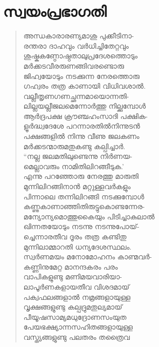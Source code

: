 
\section{സ്വയംപ്രഭാഗതി}

\begin{verse}
അന്ധകാരാരണ്യമാശു പുക്കീടിനാ-\\
രന്തരാ ദാഹവും വര്‍ധിച്ചിതേറ്റവും\\
ശുഷ്കകണ്ഠോഷ്ഠതാലുപ്രദേശത്തൊടും\\
മര്‍ക്കടവീരരുണങ്ങിവരണ്ടൊരു\\
ജിഹ്വയോടും നടക്കുന്ന നേരത്തൊരു\\
ഗഹ്വരം തത്ര കാണായി വിധിവശാല്‍.\\
വല്ലീതൃണഗണച്ഛന്നമായൊന്നതി-\\
ലില്ലയല്ലീജലമെന്നോര്‍ത്തു നില്ക്കുമ്പോള്‍\\
ആര്‍ദ്രപക്ഷ ക്രൗഞ്ചഹംസാദി പക്ഷിക-\\
ളൂര്‍ദ്ധ്വദേശേ പറന്നാരതില്‍നിന്നുടന്‍\\
പക്ഷങ്ങളില്‍ നിന്നു വീണു ജലകണം\\
മര്‍ക്കടന്മാരുമതുകണ്ടു കല്പിച്ചാര്‍.\\
“നല്ല ജലമതിലുണ്ടെന്നു നിര്‍ണയ-\\
മെല്ലാവരും നാമിതിലിറങ്ങീടുക.’\\
എന്നു പറഞ്ഞോരു നേരത്തു മാരുതി\\
മുന്നിലിറങ്ങിനാന്‍ മറ്റുള്ളവര്‍കളും\\
പിന്നാലെ തന്നിലിറങ്ങി നടക്കുമ്പോള്‍\\
കണ്ണുകാണാഞ്ഞിതിരുട്ടുകൊണ്ടന്നേര-\\
മന്യോന്യമൊത്തുകൈയും പിടിച്ചാകുലാല്‍\\
ഖിന്നതയോടും നടന്നു നടന്നുപോയ്-\\
ച്ചെന്നാരതീവ ദൂരം തത്ര കണ്ടിതു\\
മുന്നിലാമ്മാറതി ധന്യദേശസ്ഥലം.\\
സ്വര്‍ണമയം മനോമോഹനം കാണ്മവര്‍-\\
കണ്ണിനുമേറ്റ മാനന്ദകരം പരം\\
വാപികളുണ്ടു മണിമയവാരിയാ-\\
ലാപൂര്‍ണകളായതീവ വിശദമായ്\\
പക്വഫലങ്ങളാല്‍ നമ്രങ്ങളായുള്ള\\
വൃക്ഷങ്ങളുണ്ടു കല്പദ്രുമതുല്യമായ്\\
പീയൂഷസാമ്യമധുദ്രോണസംയുത\\
പേയഭക്ഷ്യാന്നസഹിതങ്ങളായുള്ള\\
വസ്ത്യങ്ങളുണ്ടു പലതരം തത്രൈവ\\

\end{verse}
